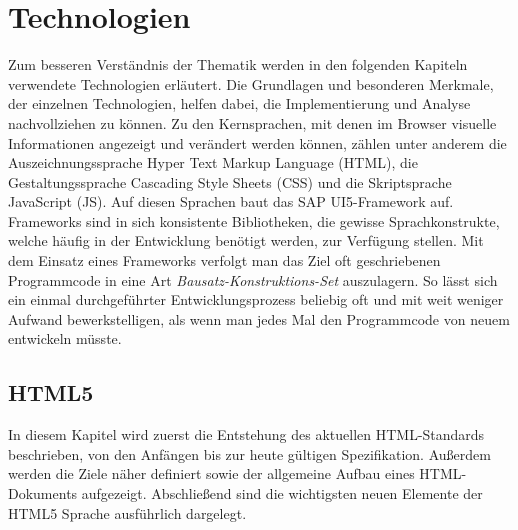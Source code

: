 \section{Technologien}\label{technologien}
Zum besseren Verständnis der Thematik werden in den folgenden Kapiteln verwendete Technologien erläutert. Die Grundlagen und besonderen Merkmale, der einzelnen Technologien, helfen dabei, die Implementierung und Analyse nachvollziehen zu können. Zu den Kernsprachen, mit denen im Browser visuelle Informationen angezeigt und verändert werden können, zählen unter anderem die Auszeichnungssprache Hyper Text Markup Language (HTML), die Gestaltungssprache Cascading Style Sheets (CSS) und die Skriptsprache JavaScript (JS). Auf diesen Sprachen baut das SAP UI5-Framework auf. Frameworks sind in sich konsistente Bibliotheken, die gewisse Sprachkonstrukte, welche häufig in der Entwicklung benötigt werden, zur Verfügung stellen. Mit dem Einsatz eines Frameworks verfolgt man das Ziel oft geschriebenen Programmcode in eine Art \textit{Bausatz-Konstruktions-Set} auszulagern. So lässt sich ein einmal durchgeführter Entwicklungsprozess beliebig oft und mit weit weniger Aufwand bewerkstelligen, als wenn man jedes Mal den Programmcode von neuem entwickeln müsste.

\subsection{HTML5}
In diesem Kapitel wird zuerst die Entstehung des aktuellen HTML-Standards beschrieben, von den Anfängen bis zur heute gültigen Spezifikation. Außerdem werden die Ziele näher definiert sowie der allgemeine Aufbau eines HTML-Dokuments aufgezeigt. Abschließend sind die wichtigsten neuen Elemente der HTML5 Sprache ausführlich dargelegt.

